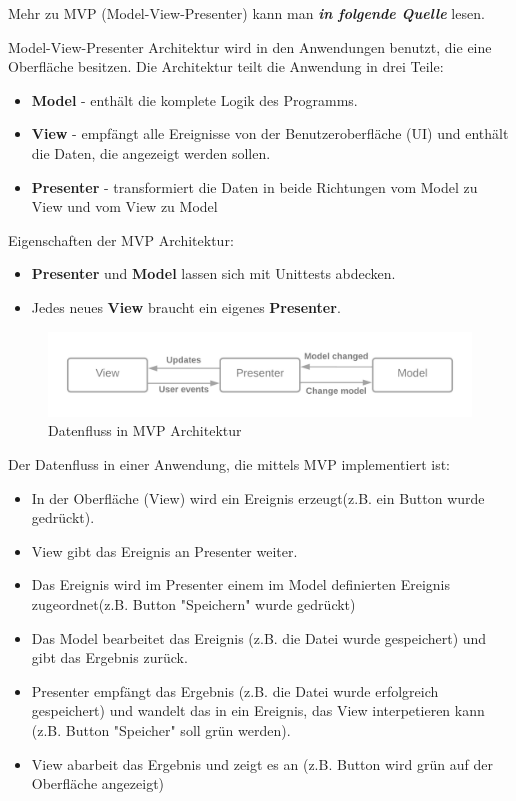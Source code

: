 Mehr zu MVP (Model-View-Presenter) kann man \textit{\textbf{in folgende Quelle}} lesen.

Model-View-Presenter Architektur wird in den Anwendungen benutzt, die eine Oberfläche besitzen.
Die Architektur teilt die Anwendung in drei Teile:
\begin{itemize}
    \item \textbf{Model} - enthält die komplete Logik des Programms.
    \item \textbf{View} - empfängt alle Ereignisse von der Benutzeroberfläche (UI) und enthält die Daten, die angezeigt werden sollen.
    \item \textbf{Presenter} - transformiert die Daten in beide Richtungen vom Model zu View 
    und vom View zu Model
\end{itemize}


Eigenschaften der MVP Architektur:
\begin{itemize}
    \item \textbf{Presenter} und \textbf{Model} lassen sich mit Unittests abdecken.
    \item Jedes neues \textbf{View} braucht ein eigenes \textbf{Presenter}.
\end{itemize}

\begin{figure}[H]
    \centering
    \includegraphics[width=1\textwidth]{./images/MVP.png}
    \caption[Datenfluss in MVP Architektur]{Datenfluss in MVP Architektur}
    \label{fig:MVP}
\end{figure}

Der Datenfluss in einer Anwendung, die mittels MVP implementiert ist:
\begin{itemize}
    \item In der Oberfläche (View) wird ein Ereignis erzeugt(z.B. ein Button wurde gedrückt).
    \item View gibt das Ereignis an Presenter weiter.
    \item Das Ereignis wird im Presenter einem im Model definierten Ereignis zugeordnet(z.B. Button "Speichern" wurde gedrückt)
    \item Das Model bearbeitet das Ereignis (z.B. die Datei wurde gespeichert) und gibt das Ergebnis zurück.
    \item Presenter empfängt das Ergebnis (z.B. die Datei wurde erfolgreich gespeichert) und wandelt das in ein Ereignis,
    das View interpetieren kann (z.B. Button "Speicher" soll grün werden).
    \item View abarbeit das Ergebnis und zeigt es an (z.B. Button wird grün auf der Oberfläche angezeigt)
\end{itemize}